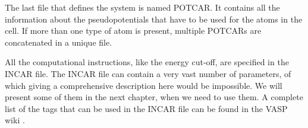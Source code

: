 The last file that defines the system is named POTCAR. It contains all the information about the pseudopotentials that have to be used for the atoms in the cell. If more than one type of atom is present, multiple POTCARs are concatenated in a unique file.

All the computational instructions, like the energy cut-off, are specified in the INCAR file. The INCAR file can contain a very vast number of parameters, of which giving a comprehensive description here would be impossible. We will  present some of them in the next chapter, when we need to use them. A complete list of the tags that can be used in the INCAR file can be found in the VASP wiki \cite{zotero-172}.

